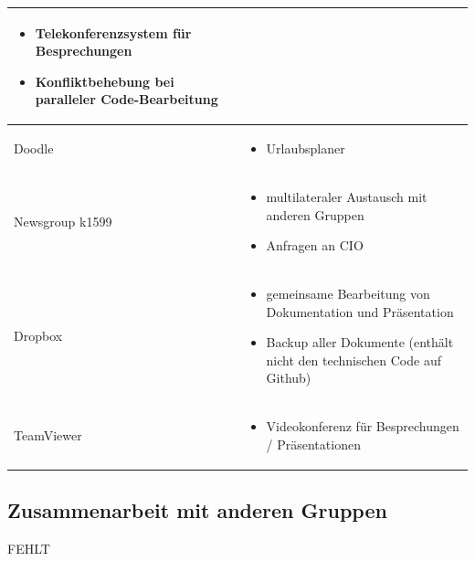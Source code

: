 \begin{minipage}{\textwidth}
\begin{center}
\begin{tabular}{lp{12cm}}
\begin{minipage}[t]{1\textwidth}
\begin{itemize}
    \item Telekonferenzsystem für Besprechungen
    \item Konfliktbehebung bei paralleler Code-Bearbeitung
    \end{itemize}
  \end{minipage}\\
  \midrule
Doodle & 
  \begin{minipage}[t]{1\textwidth}
    \begin{itemize}
    \item Urlaubsplaner
    \end{itemize}
  \end{minipage}\\
  \midrule
Newsgroup k1599 & 
  \begin{minipage}[t]{1\textwidth}
    \begin{itemize}
    \item multilateraler Austausch mit anderen Gruppen
    \item Anfragen an CIO
    \end{itemize}
  \end{minipage}\\
  \midrule
Dropbox & 
  \begin{minipage}[t]{1\textwidth}
    \begin{itemize}
    \item gemeinsame Bearbeitung von Dokumentation \newline und Präsentation
    \item Backup aller Dokumente \newline(enthält nicht den technischen Code auf Github)
    \end{itemize}
  \end{minipage}\\
  \midrule
TeamViewer & 
  \begin{minipage}[t]{1\textwidth}
    \begin{itemize}
    \item Videokonferenz für Besprechungen / Präsentationen
    \end{itemize}
  \end{minipage}\\
\bottomrule
\end{tabular}
\end{center}
\end{minipage}

\subsection{Zusammenarbeit mit anderen Gruppen}
FEHLT

